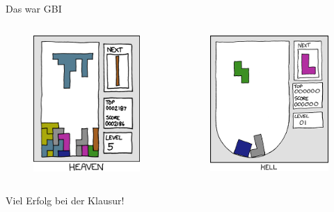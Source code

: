 \begin{frame}{Das war GBI}
	\begin{columns}
		\pause
		\begin{figure}[H]
			\vspace{-20pt}
			\includegraphics[scale=0.45]{xkcd/heaven}
		\end{figure}
	
		\pause
		\begin{figure}[H]
			\vspace{-20pt}
			\includegraphics[scale=0.45]{xkcd/hell}
		\end{figure}
	\end{columns}
\end{frame}

\begin{frame}
	\huge \centering Viel Erfolg bei der Klausur!
\end{frame}


\slideThanks

